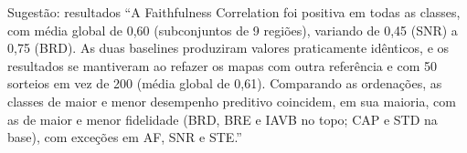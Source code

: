 \documentclass[11pt,a4paper]{article}
\begin{document}
\begin{infobox}[ok]{Sugestão: resultados}
“A Faithfulness Correlation foi positiva em todas as classes, com média global de 0,60 (subconjuntos de 9 regiões), variando de 0,45 (SNR) a 0,75 (BRD). As duas baselines produziram valores praticamente idênticos, e os resultados se mantiveram ao refazer os mapas com outra referência e com 50 sorteios em vez de 200 (média global de 0,61). Comparando as ordenações, as classes de maior e menor desempenho preditivo coincidem, em sua maioria, com as de maior e menor fidelidade (BRD, BRE e IAVB no topo; CAP e STD na base), com exceções em AF, SNR e STE.”
\end{infobox}
\end{document}
